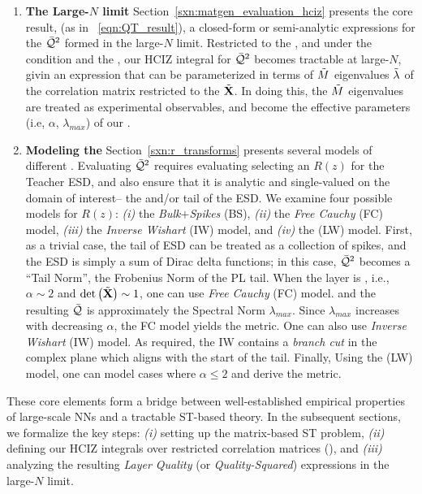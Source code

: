 \begin{enumerate}[label=5.\arabic*]
\item
\textbf{The Large-$N$ limit}
Section~\ref{sxn:matgen_evaluation_hciz} presents the core result,
(as in \EQN~\ref{eqn:QT_result}),
a closed-form or semi-analytic expressions for the \LayerQualitySquared $\bar{\mathcal{Q}}^{2}$
formed in the large-$N$ limit.
Restricted to the \ECS, and under  the \TRACELOG condition and the \IFA, our
HCIZ integral for $\bar{\mathcal{Q}}^{2}$ becomes tractable at large-$N$, givin an expression that can be parameterized
in terms of $\tilde{M}$ eigenvalues $\tilde{\lambda}$ of the \Teacher correlation matrix 
restricted to the \ECS $\tilde{\mathbf{X}}$.
In doing this, the $\tilde{M}$ \Teacher eigenvalues are treated as experimental observables, and 
become the effective \SemiEmpirical parameters (i.e, $\alpha$, $\lambda_{max}$) of our \SETOL.

\item
\textbf{Modeling the \HeavyTailed \RTransform}
Section~\ref{sxn:r_transforms} presents several  models of different \RTransforms.
Evaluating $\bar{\mathcal{Q}}^{2}$ requires evaluating selecting an \RTransform $R(z)$ for the Teacher ESD,
and also ensure that it is analytic and single-valued on the domain of interest-- the \ECS and/or tail of the ESD.
We examine four possible models for $R(z)$: \emph{(i)} the \emph{Bulk$+$Spikes} (BS),
\emph{(ii)} the \emph{Free Cauchy} (FC) model, 
\emph{(iii)} the \emph{Inverse Wishart} (IW) model, 
and \emph{(iv)} the  \LevyWigner (LW) model.
First, as a trivial case, the tail of ESD can be treated as a collection of spikes,
and the ESD is simply a sum of Dirac delta functions; in this case,
$\bar{\mathcal{Q}}^{2}$ becomes a ``Tail Norm'', the Frobenius Norm of the PL tail.
When the layer is \Ideal, i.e., $\alpha\sim 2$ and $\mbox{}{\text{det}}\left(\tilde{\mathbf{X}}\right)\sim 1$,
one can use  \emph{Free Cauchy} (FC) model.  and the resulting \LayerQuality $\bar{\mathcal{Q}}$
is approximately the Spectral Norm $\lambda_{max}$.
Since $\lambda_{max}$ increases with decreasing $\alpha$, the FC model yields the \HTSR \ALPHA metric.
One can also use  \emph{Inverse Wishart} (IW) model. 
As required, the IW \RTransform contains a \emph{branch cut} in the complex plane
which aligns with the start of the \ECS \PowerLaw tail.
Finally, Using the \LevyWigner (LW) model, one can model cases where
$\alpha\le 2$ and derive the \HTSR \ALPHAHAT metric.
\end{enumerate}

\vspace*{1em}

These core elements form a bridge between well-established empirical properties of large-scale NNs 
and a tractable ST-based theory. In the subsequent sections, we formalize the key steps: 
\emph{(i)} setting up the matrix-based ST problem, \emph{(ii)} defining our HCIZ integrals 
over restricted correlation matrices (\ECS), and \emph{(iii)} analyzing the resulting 
\emph{Layer Quality} (or \emph{Quality-Squared}) expressions in the large-$N$ limit.
